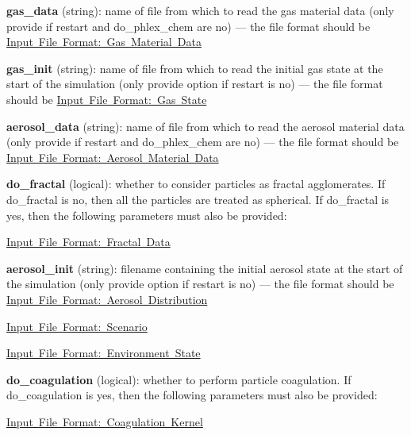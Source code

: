 \begin{DoxyItemize}
\begin{DoxyItemize}
\end{DoxyItemize}
\item {\bfseries gas\+\_\+data} (string)\+: name of file from which to read the gas material data (only provide if {\ttfamily restart} and {\ttfamily do\+\_\+phlex\+\_\+chem} are {\ttfamily no}) --- the file format should be \mbox{\hyperlink{input_format_gas_data}{Input File Format\+: Gas Material Data}}
\item {\bfseries gas\+\_\+init} (string)\+: name of file from which to read the initial gas state at the start of the simulation (only provide option if {\ttfamily restart} is {\ttfamily no}) --- the file format should be \mbox{\hyperlink{input_format_gas_state}{Input File Format\+: Gas State}}
\item {\bfseries aerosol\+\_\+data} (string)\+: name of file from which to read the aerosol material data (only provide if {\ttfamily restart} and do\+\_\+phlex\+\_\+chem are {\ttfamily no}) --- the file format should be \mbox{\hyperlink{input_format_aero_data}{Input File Format\+: Aerosol Material Data}}
\item {\bfseries do\+\_\+fractal} (logical)\+: whether to consider particles as fractal agglomerates. If {\ttfamily do\+\_\+fractal} is {\ttfamily no}, then all the particles are treated as spherical. If {\ttfamily do\+\_\+fractal} is {\ttfamily yes}, then the following parameters must also be provided\+:
\begin{DoxyItemize}
\item \mbox{\hyperlink{input_format_fractal}{Input File Format\+: Fractal Data}}
\end{DoxyItemize}
\item {\bfseries aerosol\+\_\+init} (string)\+: filename containing the initial aerosol state at the start of the simulation (only provide option if {\ttfamily restart} is {\ttfamily no}) --- the file format should be \mbox{\hyperlink{input_format_aero_dist}{Input File Format\+: Aerosol Distribution}}
\item \mbox{\hyperlink{input_format_scenario}{Input File Format\+: Scenario}}
\item \mbox{\hyperlink{input_format_env_state}{Input File Format\+: Environment State}}
\item {\bfseries do\+\_\+coagulation} (logical)\+: whether to perform particle coagulation. If {\ttfamily do\+\_\+coagulation} is {\ttfamily yes}, then the following parameters must also be provided\+:
\begin{DoxyItemize}
\item \mbox{\hyperlink{input_format_coag_kernel}{Input File Format\+: Coagulation Kernel}}

\end{DoxyItemize}
\end{DoxyItemize}

